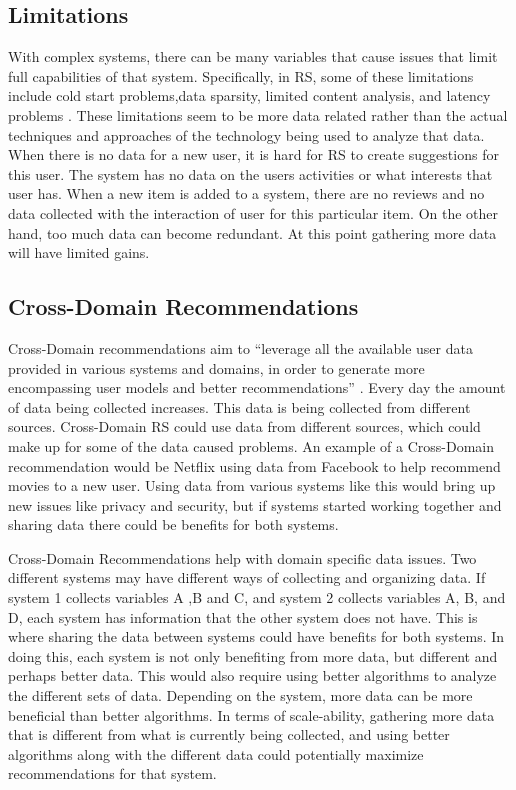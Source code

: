 \documentclass[sigconf]{acmart}
\begin{document}
\subsection{Limitations}
With complex systems, there can be many variables that cause issues that limit full capabilities of that
system. Specifically, in RS, some of these limitations include cold start problems,data sparsity, limited
content analysis, and latency problems \cite{Khusro2016}. These limitations seem to be more data related rather
than the actual techniques and approaches of the technology being used to analyze that data. When there is no
data for a new user, it is hard for RS to create suggestions for this user. The system has no data on the users
activities or what interests that user has. When a new item is added to a system, there are no reviews and no
data collected with the interaction of user for this particular item. On the other hand, too much data can
become redundant. At this point gathering more data will have limited gains. 

\subsection{Cross-Domain Recommendations}
Cross-Domain recommendations aim to ``leverage all the available user data provided in various systems and
domains, in order to generate more encompassing user models and better recommendations'' \cite{Cantador2015}.
Every day the amount of data being collected increases. This data is being collected from different sources.
Cross-Domain RS could use data from different sources, which could make up for some of the data caused
problems. An example of a Cross-Domain recommendation would be Netflix using data from Facebook to help
recommend movies to a new user. Using data from various systems like this would bring up new issues like
privacy and security, but if systems started working together and sharing data there could be benefits for both
systems. 

Cross-Domain Recommendations help with domain specific data issues. Two different systems may have different
ways of collecting and organizing data. If system 1 collects variables A ,B and C, and system 2 collects
variables A, B, and D, each system has information that the other system does not have. This is where sharing
the data between systems could have benefits for both systems. In doing this, each system is not only
benefiting from more data, but different and perhaps better data. This would also require using better
algorithms to analyze the different sets of data. Depending on the system, more data  can be more beneficial
than better algorithms. In terms of scale-ability, gathering more data that is different from what is currently
being collected, and using better algorithms along with the different data could potentially maximize
recommendations for that system.
\end{document}
